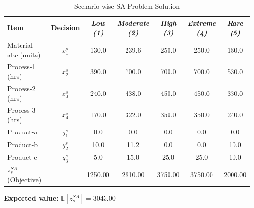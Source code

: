 \documentclass[7pt]{article}
\begin{document}
\begin{table}[h!]
    \centering
    \small
    \caption{Scenario-wise SA Problem Solution}
    \begin{tabular}{l|c|ccccc}
        \toprule
        \textbf{Item}          & \textbf{Decision} & \textit{Low (1)} & \textit{Moderate (2)} & \textit{High (3)} & \textit{Extreme (4)} & \textit{Rare (5)} \\
        \midrule
        Material-abc (units)   & $x_1^s$           & 130.0            & 239.6                 & 250.0             & 250.0                & 180.0             \\
        Process-1 (hrs)        & $x_2^s$           & 390.0            & 700.0                 & 700.0             & 700.0                & 530.0             \\
        Process-2 (hrs)        & $x_3^s$           & 240.0            & 438.0                 & 450.0             & 450.0                & 330.0             \\
        Process-3 (hrs)        & $x_4^s$           & 170.0            & 322.0                 & 350.0             & 350.0                & 240.0             \\
        Product-a              & $y_1^s$           & 0.0              & 0.0                   & 0.0               & 0.0                  & 0.0               \\
        Product-b              & $y_2^s$           & 10.0             & 11.2                  & 0.0               & 0.0                  & 10.0              \\
        Product-c              & $y_3^s$           & 5.0              & 15.0                  & 25.0              & 25.0                 & 10.0              \\
        \midrule
        $z_s^{SA}$ (Objective) &                   & 1250.00          & 2810.00               & 3750.00           & 3750.00              & 2000.00           \\
        \bottomrule
    \end{tabular}

    \vspace{0.5em}
    \textbf{Expected value:} $\mathbb{E}[z_s^{SA}] = \mathbf{3043.00}$
\end{table}
\end{document}
